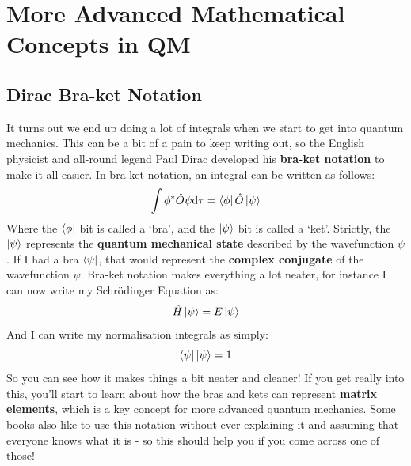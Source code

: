 \documentclass{memoir}[11pt,oneside,a4paper,openany]
\begin{document}
\chapter{More Advanced Mathematical Concepts in QM}\label{app:QM_maths}
\section{Dirac Bra-ket Notation}
It turns out we end up doing a lot of integrals when we start to get into quantum mechanics. This can be a bit of a pain to keep writing out, so the English physicist and all-round legend Paul Dirac developed his \textbf{bra-ket notation} to make it all easier. In bra-ket notation, an integral can be written as follows:
\begin{equation}
	\int \phi^* \hat{O} \psi \mathrm{d}\tau = \bra{\phi}\hat{O}\ket{\psi}
\end{equation}
Where the $\bra{\phi}$ bit is called a `bra', and the $\ket{\psi}$ bit is called a `ket'. Strictly, the $\ket{\psi}$ represents the \textbf{quantum mechanical state} described by the wavefunction $\psi$. If I had a bra $\bra{\psi}$, that would represent the \textbf{complex conjugate} of the wavefunction $\psi$. Bra-ket notation makes everything a lot neater, for instance I can now write my Schr{\"o}dinger Equation as:
\begin{equation}
	\hat{H}\ket{\psi} = E\ket{\psi}
\end{equation}
And I can write my normalisation integrals as simply:
\begin{equation}
	\bra{\psi}\ket{\psi} = 1
\end{equation}
So you can see how it makes things a bit neater and cleaner! If you get really into this, you'll start to learn about how the bras and kets can represent \textbf{matrix elements}, which is a key concept for more advanced quantum mechanics. Some books also like to use this notation without ever explaining it and assuming that everyone knows what it is - so this should help you if you come across one of those!
\end{document}
